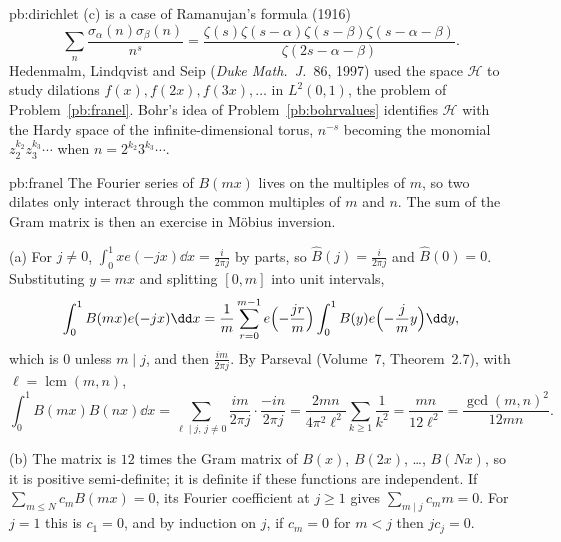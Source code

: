\begin{solution}{pb:dirichlet}
\leads (c) is a case of Ramanujan's formula (1916)
\[
\sum_n\frac{\sigma_\alpha(n)\sigma_\beta(n)}{n^s}=\frac{\zeta(s)\zeta(s-\alpha)\zeta(s-\beta)\zeta(s-\alpha-\beta)}{\zeta(2s-\alpha-\beta)}.
\] Hedenmalm, Lindqvist and
Seip (\emph{Duke Math.\ J.}\ 86, 1997) used the space $\mathcal H$ to study dilations $f(x),f(2x),f(3x),\dots$ in $L^2(0,1)$, the problem of Problem~\ref{pb:franel}. Bohr's idea of
Problem~\ref{pb:bohrvalues} identifies $\mathcal H$ with the Hardy space of the infinite-dimensional torus, $n^{-s}$ becoming the monomial $z_2^{k_2}z_3^{k_3}\cdots$ when $n=2^{k_2}3^{k_3}\cdots$.
\end{solution}

\begin{solution}{pb:franel}
\idea The Fourier series of $B(mx)$ lives on the multiples of $m$, so two dilates only interact through the common multiples of $m$ and $n$. The sum of the Gram
matrix is then an exercise in Möbius inversion.

\writeup (a) For $j\ne0$, $\int_0^1xe(-jx)\dd x=\frac{i}{2\pi j}$ by parts, so $\hat B(j)=\frac i{2\pi j}$ and $\hat B(0)=0$. Substituting $y=mx$ and splitting $[0,m]$ into unit intervals,
\[
\int_0^1B(mx)e(-jx)\dd x=\frac1m\sum_{r=0}^{m-1}e\Bigl(-\frac{jr}m\Bigr)\int_0^1B(y)e\Bigl(-\frac jmy\Bigr)\dd y,
\]
which is $0$ unless $m\mid j$, and then $\frac{im}{2\pi j}$. By Parseval (Volume~7, Theorem~2.7), with $\ell=\operatorname{lcm}(m,n)$,
\[
\int_0^1B(mx)B(nx)\dd x=\sum_{\ell\mid j,\,j\ne0}\frac{im}{2\pi j}\cdot\frac{-in}{2\pi j}=\frac{2mn}{4\pi^2\ell^2}\sum_{k\ge1}\frac1{k^2}=\frac{mn}{12\ell^2}=\frac{\gcd(m,n)^2}{12mn}.
\]

(b) The matrix is $12$ times the Gram matrix of $B(x)$, $B(2x)$, \dots, $B(Nx)$, so it is positive semi-definite; it is definite if these functions are independent. If
$\sum_{m\le N}c_mB(mx)=0$, its Fourier coefficient at $j\ge1$ gives $\sum_{m\mid j}c_mm=0$. For $j=1$ this is $c_1=0$, and by induction on $j$, if $c_m=0$ for $m<j$ then $jc_j=0$.


\end{solution}
